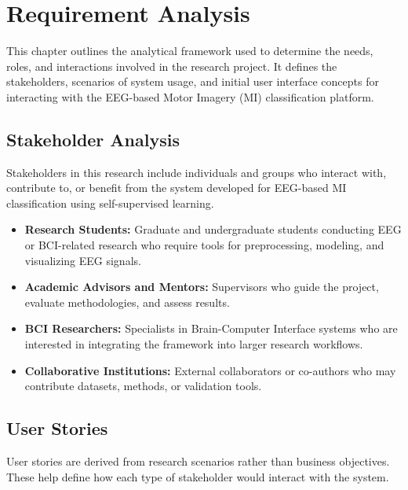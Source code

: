 \chapter{Requirement Analysis}
\label{chap:requirement-analysis}

This chapter outlines the analytical framework used to determine the needs, roles, and interactions involved in the research project. It defines the stakeholders, scenarios of system usage, and initial user interface concepts for interacting with the EEG-based Motor Imagery (MI) classification platform.

\section{Stakeholder Analysis}
\label{section:stakeholder-analysis}

Stakeholders in this research include individuals and groups who interact with, contribute to, or benefit from the system developed for EEG-based MI classification using self-supervised learning.

\begin{itemize}
    \item \textbf{Research Students:} Graduate and undergraduate students conducting EEG or BCI-related research who require tools for preprocessing, modeling, and visualizing EEG signals.
    \item \textbf{Academic Advisors and Mentors:} Supervisors who guide the project, evaluate methodologies, and assess results.
    \item \textbf{BCI Researchers:} Specialists in Brain-Computer Interface systems who are interested in integrating the framework into larger research workflows.
    \item \textbf{Collaborative Institutions:} External collaborators or co-authors who may contribute datasets, methods, or validation tools.
\end{itemize}

\section{User Stories}
\label{section:user-stories}

User stories are derived from research scenarios rather than business objectives. These help define how each type of stakeholder would interact with the system.

